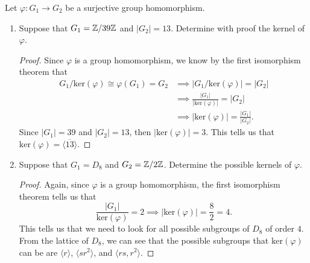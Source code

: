 \documentclass[a4paper]{article}
\begin{document}
{}
\rhead{\thepage}
\begin{problem}
    Let \( \varphi: {G}_{1} \to {G}_{2} \) be a surjective group homomorphism. 
    \begin{enumerate}
        \item[(a)] Suppose that \( {G}_{1} = \mathbb{Z} / 39 \mathbb{Z}   \) and \( | {G}_{2} |  = 13 \). Determine with proof the kernel of \( \varphi \). 
            \begin{proof}
            Since \( \varphi  \) is a group homomorphism, we know by the first isomorphism theorem that 
            \begin{align*}
                {G}_{1} / \text{ker}(\varphi) \cong \varphi({G}_{1}) = {G}_{2} &\implies | {G}_{1} / \text{ker}(\varphi) | =  | {G}_{2} |       \\
                                                                               &\implies \frac{ | {G}_{1} |  }{  | \text{ker}(\varphi)  |  }  = | {G}_{2} |  \\ 
                                                                               &\implies | \text{ker}(\varphi)   | = \frac{ | {G}_{1} |  }{ | {G}_{2} |  }.  
            \end{align*}
            Since \( | {G}_{1} |  = 39 \) and \( | {G}_{2} |  = 13 \), then \( | \text{ker}(\varphi)  |  = 3 \). This tells us that \( \text{ker}(\varphi) = \langle \overline{13}   \rangle  \).  
            \end{proof}
        \item[(b)] Suppose that \( {G}_{1} = {D}_{8}  \) and \( {G}_{2} = \mathbb{Z} / 2 \mathbb{Z} \). Determine the possible kernels of \( \varphi \). 
            \begin{proof}
            Again, since \( \varphi  \) is a group homomorphism, the first isomorphism theorem tells us that 
            \[  \frac{ | {G}_{1} |  }{ \text{ker}(\varphi)  }  = 2 \implies | \text{ker}(\varphi)  | = \frac{ 8 }{ 2 }  = 4.   \]
            This tells us that we need to look for all possible subgroups of \( {D}_{8} \) of order \( 4 \). From the lattice of \( {D}_{8} \), we can see that the possible subgroups that \( \text{ker}(\varphi)  \) can be are \( \langle r \rangle \), \( \langle  s r^{2}  \rangle \), and \( \langle rs , r^{2} \rangle \).  
            \end{proof}

\end{enumerate}
\end{problem}
\end{document}
